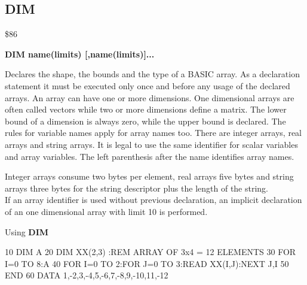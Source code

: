 \subsection{DIM}
\begin{description}[leftmargin=3cm,style=nextline]
\item [Token:] \$86
\item [Format:] {\bf DIM name(limits) [,name(limits)]...}
\item [Usage:] Declares the shape,
               the bounds and the type of a BASIC array.
               As a declaration statement it must be executed
               only once and before any usage of the declared arrays.
               An array can have one or more dimensions.
               One dimensional arrays are often called vectors
               while two or more dimensions define a matrix.
               The lower bound of a dimension is always zero,
               while the upper bound is declared. The rules for
               variable names apply for array names too.
               There are integer arrays, real arrays and string arrays.
               It is legal to use the same identifier for scalar
               variables and array variables. The left parenthesis
               after the name identifies array names.

\item [Remarks:] Integer arrays consume two bytes per element,
                 real arrays five bytes and string arrays three bytes
                 for the string descriptor plus
                 the length of the string. \\
                 If an array identifier is used without previous
                 declaration, an implicit declaration of an
                 one dimensional array with limit 10 is performed.

\item [Example:] Using {\bf DIM}
\begin{screenoutput}
10 DIM A%
20 DIM XX(2,3) :REM ARRAY OF 3x4 = 12 ELEMENTS
30 FOR I=0 TO 8:A%
40 FOR I=0 TO 2:FOR J=0 TO 3:READ XX(I,J):NEXT J,I
50 END
60 DATA 1,-2,3,-4,5,-6,7,-8,9,-10,11,-12
\end{screenoutput}
\end{description}


\newpage
